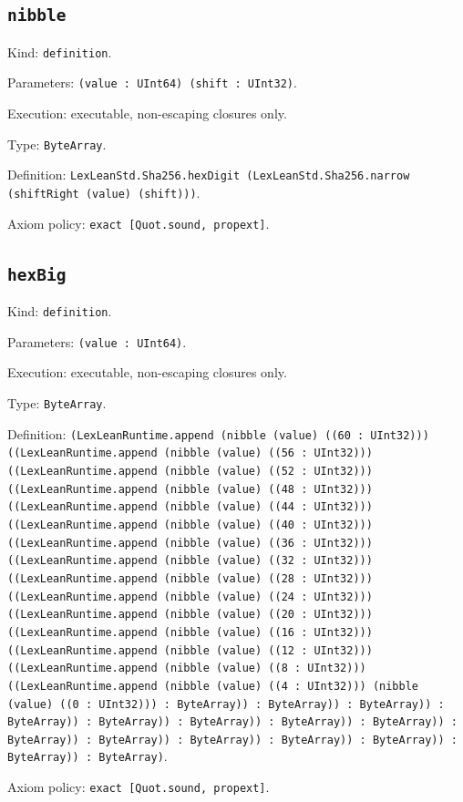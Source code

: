 \documentclass[11pt]{article}
\begin{document}
\subsection*{\texttt{nibble}}
\noindent Kind: \texttt{definition}.\par
\noindent Parameters: \texttt{(value : UInt64) (shift : UInt32)}.\par
\noindent Execution: executable, non-escaping closures only.\par
\noindent Type: \texttt{ByteArray}.\par
\noindent Definition: \texttt{LexLeanStd.Sha256.hexDigit (LexLeanStd.Sha256.narrow (shiftRight (value) (shift)))}.\par
\noindent Axiom policy: \texttt{exact [Quot.sound, propext]}.\par
\subsection*{\texttt{hexBig}}
\noindent Kind: \texttt{definition}.\par
\noindent Parameters: \texttt{(value : UInt64)}.\par
\noindent Execution: executable, non-escaping closures only.\par
\noindent Type: \texttt{ByteArray}.\par
\noindent Definition: \texttt{(LexLeanRuntime.append (nibble (value) ((60 : UInt32))) ((LexLeanRuntime.append (nibble (value) ((56 : UInt32))) ((LexLeanRuntime.append (nibble (value) ((52 : UInt32))) ((LexLeanRuntime.append (nibble (value) ((48 : UInt32))) ((LexLeanRuntime.append (nibble (value) ((44 : UInt32))) ((LexLeanRuntime.append (nibble (value) ((40 : UInt32))) ((LexLeanRuntime.append (nibble (value) ((36 : UInt32))) ((LexLeanRuntime.append (nibble (value) ((32 : UInt32))) ((LexLeanRuntime.append (nibble (value) ((28 : UInt32))) ((LexLeanRuntime.append (nibble (value) ((24 : UInt32))) ((LexLeanRuntime.append (nibble (value) ((20 : UInt32))) ((LexLeanRuntime.append (nibble (value) ((16 : UInt32))) ((LexLeanRuntime.append (nibble (value) ((12 : UInt32))) ((LexLeanRuntime.append (nibble (value) ((8 : UInt32))) ((LexLeanRuntime.append (nibble (value) ((4 : UInt32))) (nibble (value) ((0 : UInt32))) : ByteArray)) : ByteArray)) : ByteArray)) : ByteArray)) : ByteArray)) : ByteArray)) : ByteArray)) : ByteArray)) : ByteArray)) : ByteArray)) : ByteArray)) : ByteArray)) : ByteArray)) : ByteArray)) : ByteArray)}.\par
\noindent Axiom policy: \texttt{exact [Quot.sound, propext]}.\par
\end{document}
